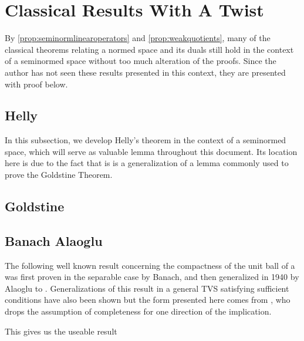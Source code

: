 
\section{Classical Results With A Twist}

By \ref{prop:seminormlinearoperators} and \ref{prop:weakquotients}, many of the classical theorems relating a normed space and its duals still hold in the context of a seminormed space without too much alteration of the proofs. Since the author has not seen these results presented in this context, they are presented with proof below. 
\subsection{Helly}
In this subsection, we develop Helly's theorem in the context of a seminormed space, which will serve as valuable lemma throughout this document. Its location here is due to the fact that  is is a generalization of a lemma commonly used to prove the Goldstine Theorem. 


\subsection{Goldstine} 


\subsection{Banach Alaoglu}
The following well known result concerning the 
\weakstar
compactness 
of the unit ball of a
\BanachSpace was first proven in the 
separable 
case by Banach, and then generalized in 1940 by Alaoglu \cite{alaoglu40} to \BanachSpaces. 
Generalizations of this result in a general TVS satisfying sufficient conditions 
have also been shown but the form presented here comes from \cite{hester07}, 
who drops the assumption of completeness for one direction of the implication. 


This gives us the useable result


